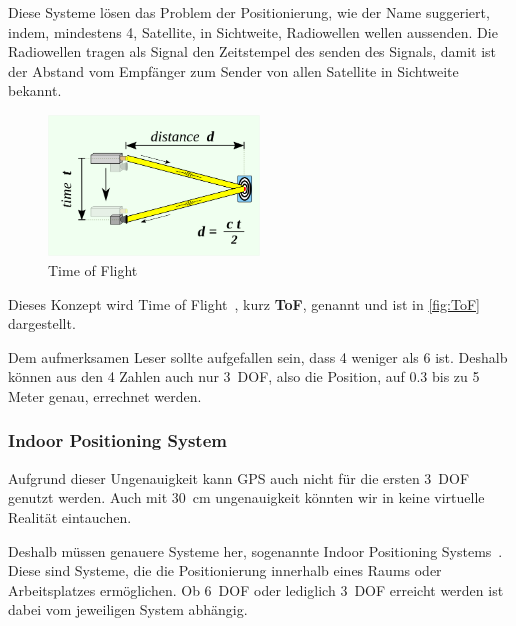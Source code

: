         Diese Systeme lösen das Problem der Positionierung, wie der Name suggeriert, indem, mindestens 4, Satellite, in Sichtweite, Radiowellen wellen aussenden.
        Die Radiowellen tragen als Signal den Zeitstempel des senden des Signals, damit ist der Abstand vom Empfänger zum Sender von allen Satellite in Sichtweite bekannt.
        \begin{figure}[ht!]
            \label{fig:ToF}
            \center
            \includegraphics[width={0.5\textwidth}]{../assets/img/time_of_flight}
            \caption{Time of Flight~\autocite{wikipedia-contributors-2023D}}
        \end{figure}
        Dieses Konzept wird Time of Flight~\autocite{wikipedia-contributors-2023D}, kurz \textbf{ToF}, genannt und ist in \autoref{fig:ToF} dargestellt.

        Dem aufmerksamen Leser sollte aufgefallen sein, dass 4 weniger als 6 ist.
        Deshalb können aus den 4 Zahlen auch nur 3~DOF, also die Position, auf 0.3 bis zu 5 Meter genau, errechnet werden.

    \subsubsection{Indoor Positioning System}\label{subsubsec:indoor-positioning-system}
        Aufgrund dieser Ungenauigkeit kann GPS auch nicht für die ersten 3~DOF genutzt werden.
        Auch mit 30~cm ungenauigkeit könnten wir in keine virtuelle Realität eintauchen.

        Deshalb müssen genauere Systeme her, sogenannte Indoor Positioning Systems~\autocite{wikipedia-contributors-2023E}.
        Diese sind Systeme, die die Positionierung innerhalb eines Raums oder Arbeitsplatzes ermöglichen.
        Ob 6~DOF oder lediglich 3~DOF erreicht werden ist dabei vom jeweiligen System abhängig.

